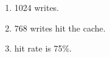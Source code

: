 \documentclass{article}
\begin{document}
\begin{enumerate}[label=\textbf{\Alph*.}]
	\item 1024 writes.
	\item 768 writes hit the cache.
	\item hit rate is 75\%.
\end{enumerate}
\end{document}

